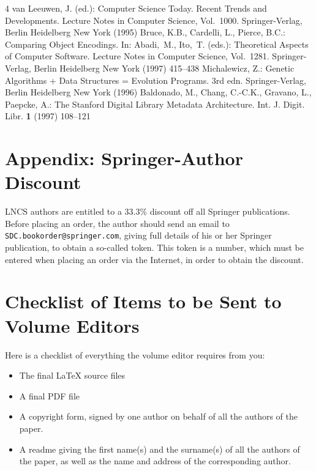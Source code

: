 \documentclass[runningheads]{llncs}
\begin{document}
\begin{thebibliography}{4}
%
van Leeuwen, J. (ed.):
Computer Science Today. Recent Trends and Developments.
Lecture Notes in Computer Science, Vol.~1000.
Springer-Verlag, Berlin Heidelberg New York (1995)
%
Bruce, K.B., Cardelli, L., Pierce, B.C.:
Comparing Object Encodings.
In: Abadi,~M., Ito,~T. (eds.):
Theoretical Aspects of Computer Software.
Lecture Notes in Computer Science, Vol.~1281.
Springer-Verlag, Berlin Heidelberg New York (1997) 415--438
%
Michalewicz, Z.:
Genetic Algorithms + Data Structures = Evolution Programs.
3rd edn. Springer-Verlag, Berlin Heidelberg New York (1996)
%
Baldonado, M., Chang, C.-C.K., Gravano, L., Paepcke, A.:
The Stanford Digital Library Metadata Architecture.
Int. J. Digit. Libr. \textbf{1} (1997) 108--121
%
\end{thebibliography}


\section*{Appendix: Springer-Author Discount}

LNCS authors are entitled to a 33.3\% discount off all Springer
publications. Before placing an order, the author should send an email
to \texttt{SDC.bookorder@springer.com}, giving full
details of his or her
Springer publication, to obtain a so-called token. This token is a
number, which must be entered when placing an order via the Internet, in
order to obtain the discount.

\section{Checklist of Items to be Sent to Volume Editors}
Here is a checklist of everything the volume editor requires from you:


\begin{itemize}
\settowidth{\leftmargin}{{\Large$\square$}}\advance\leftmargin{}
\itemsep8pt\relax
\renewcommand\labelitemi{{\lower1.5pt\hbox{\Large$\square$}}}

\item The final \LaTeX{} source files
\item A final PDF file
\item A copyright form, signed by one author on behalf of all the
authors of the paper.
\item A readme giving the first name(s) and the surname(s) of all the
authors of the paper, as well as the name and address of the
corresponding author.
\end{itemize}
\end{document}
